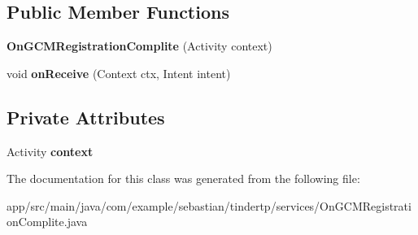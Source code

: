 \subsection*{Public Member Functions}
\begin{DoxyCompactItemize}
\item 
{\bfseries On\+G\+C\+M\+Registration\+Complite} (Activity context)\hypertarget{classcom_1_1example_1_1sebastian_1_1tindertp_1_1services_1_1OnGCMRegistrationComplite_a6d876e990c466642ee4cf26b9d382289}{}\label{classcom_1_1example_1_1sebastian_1_1tindertp_1_1services_1_1OnGCMRegistrationComplite_a6d876e990c466642ee4cf26b9d382289}

\item 
void {\bfseries on\+Receive} (Context ctx, Intent intent)\hypertarget{classcom_1_1example_1_1sebastian_1_1tindertp_1_1services_1_1OnGCMRegistrationComplite_a0a02c2814d8f2a8ace33ab5e7945dde4}{}\label{classcom_1_1example_1_1sebastian_1_1tindertp_1_1services_1_1OnGCMRegistrationComplite_a0a02c2814d8f2a8ace33ab5e7945dde4}

\end{DoxyCompactItemize}
\subsection*{Private Attributes}
\begin{DoxyCompactItemize}
\item 
Activity {\bfseries context}\hypertarget{classcom_1_1example_1_1sebastian_1_1tindertp_1_1services_1_1OnGCMRegistrationComplite_a626c133c839fd05410eff0acb9595256}{}\label{classcom_1_1example_1_1sebastian_1_1tindertp_1_1services_1_1OnGCMRegistrationComplite_a626c133c839fd05410eff0acb9595256}

\end{DoxyCompactItemize}


The documentation for this class was generated from the following file\+:\begin{DoxyCompactItemize}
\item 
app/src/main/java/com/example/sebastian/tindertp/services/On\+G\+C\+M\+Registration\+Complite.\+java\end{DoxyCompactItemize}
